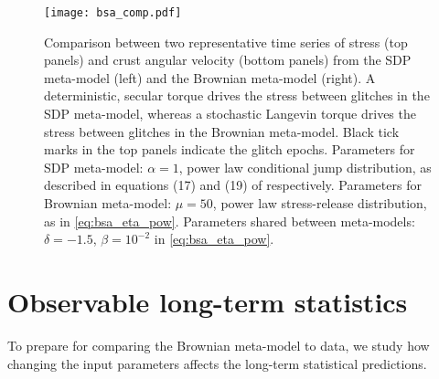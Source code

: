 \begin{figure}
\centering
\texttt{[image: bsa\_comp.pdf]}
\caption{Comparison between two representative time series of stress (top panels) and crust angular velocity (bottom panels) from the SDP meta-model (left) and the Brownian meta-model (right). A deterministic, secular torque drives the stress between glitches in the SDP meta-model, whereas a stochastic Langevin torque drives the stress between glitches in the Brownian meta-model. Black tick marks in the top panels indicate the glitch epochs. Parameters for SDP meta-model: $\alpha = 1$, power law conditional jump distribution, as described in equations (17) and (19) of \citet{Fulgenzi2017} respectively. Parameters for Brownian meta-model: $\mu=50$, power law stress-release distribution, as in \eqref{eq:bsa_eta_pow}. Parameters shared between meta-models: $\delta = -1.5$, $\beta=10^{-2}$ in \eqref{eq:bsa_eta_pow}.}
\label{fig:bsa_sd_comp}
\end{figure}


\section{Observable long-term statistics}
\label{sec:bsa_results}
To prepare for comparing the Brownian meta-model to data, we study how changing the input parameters affects the long-term statistical predictions.  

